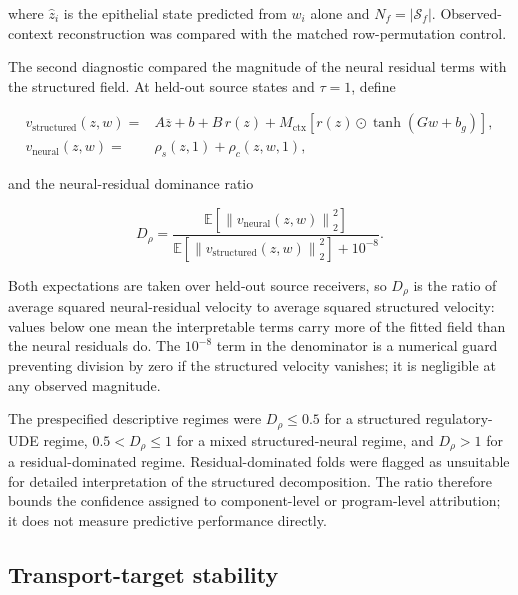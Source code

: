 where \(\widehat{z}_i\) is the epithelial state predicted from \(w_i\) alone
and \(N_f=|\mathcal{S}_f|\). Observed-context reconstruction was compared with
the matched row-permutation control.

The second diagnostic compared the magnitude of the neural residual terms with
the structured field. At held-out source states and \(\tau=1\), define

\begin{equation}
\begin{aligned}
v_{\mathrm{structured}}(z,w)
={}&
A\overline{z}
+
b
+
B\,r(z)
+
M_{\mathrm{ctx}}
\left[
r(z)
\odot
\tanh(Gw+b_g)
\right],
\\
v_{\mathrm{neural}}(z,w)
={}&
\rho_s(z,1)
+
\rho_c(z,w,1),
\end{aligned}
\label{eq:methods-structured-neural-components}
\end{equation}

and the neural-residual dominance ratio

\begin{equation}
D_{\rho}
=
\frac{
\mathbb{E}
\left[
\left\|
v_{\mathrm{neural}}(z,w)
\right\|_2^2
\right]
}{
\mathbb{E}
\left[
\left\|
v_{\mathrm{structured}}(z,w)
\right\|_2^2
\right]
+
10^{-8}
}.
\label{eq:methods-d-rho}
\end{equation}

Both expectations are taken over held-out source receivers, so \(D_{\rho}\) is
the ratio of average squared neural-residual velocity to average squared
structured velocity: values below one mean the interpretable terms carry more
of the fitted field than the neural residuals do. The \(10^{-8}\) term in the
denominator is a numerical guard preventing division by zero if the structured
velocity vanishes; it is negligible at any observed magnitude.

The prespecified descriptive regimes were
\(D_{\rho}\leq0.5\) for a structured regulatory-UDE regime,
\(0.5<D_{\rho}\leq1\) for a mixed structured-neural regime, and
\(D_{\rho}>1\) for a residual-dominated regime. Residual-dominated folds were
flagged as unsuitable for detailed interpretation of the structured
decomposition. The ratio therefore bounds the confidence assigned to
component-level or program-level attribution; it does not measure predictive
performance directly.

\subsection{Transport-target stability}
\label{sec:methods-transport-stability}

